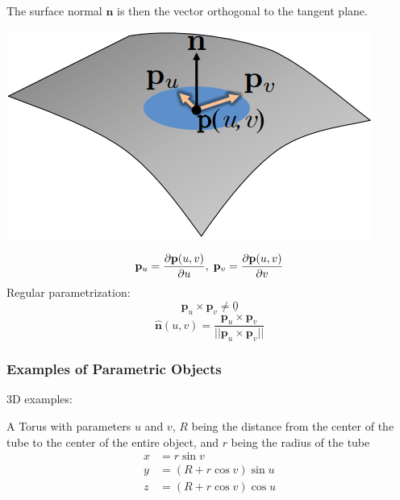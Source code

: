 \documentclass{article}
\begin{document}
The surface normal \(\mathbf{n}\) is then the vector orthogonal to the tangent plane.
\vspace{30px}
\begin{center}
    \begin{minipage}{0.4\textwidth}\raggedleft
        \includegraphics[width=1\linewidth]{images/surface_normal.png}
    \end{minipage}
    \begin{minipage}{0.5\textwidth}
        \[\mathbf{p}_u = \frac{\partial \mathbf{p}(u,v)}{\partial u},\;
        \mathbf{p}_v = \frac{\partial \mathbf{p}(u,v)}{\partial v}\]
        \hspace{20px} Regular parametrization:
        \[\mathbf{p}_u \times \mathbf{p}_v \neq \underline{0}\]
        \[\mathbf{\hat{n}}(u,v) = \frac{\mathbf{p}_u \times \mathbf{p}_v}{||\mathbf{p}_u \times \mathbf{p}_v||}\]
    \end{minipage}
\end{center}

\newpage
\subsubsection{Examples of Parametric Objects}
3D examples:

A Torus with parameters \(u\) and \(v\), \(R\) being the distance from the center of the tube to the center of
the entire object, and \(r\) being the radius of the tube
\begin{align*}
    x &= r \sin v\\
    y &= (R + r \cos v) \sin u\\
    z &= (R + r \cos v) \cos u
\end{align*}
\end{document}
